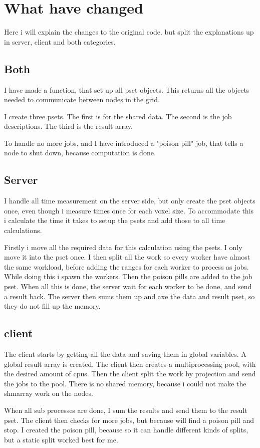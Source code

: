 \documentclass{Article}
\begin{document}
\section{What have changed}
Here i will explain the changes to the original code. but split the explanations up in server, client and both categories.
\subsection{Both}
I have made a function, that set up all pset objects. This returns all the objects needed to communicate between nodes in the grid.

I create three psets. The first is for the shared data. The second is the job descriptions. The third is the result array.

To handle no more jobs, and I have introduced a "poison pill" job, that tells a node to shut down, because computation is done.
\subsection{Server}
I handle all time measurement on the server side, but only create the pset objects once, even though i measure times once for each voxel size. To accommodate this i calculate the time it takes to setup the psets and add those to all time calculations.

Firstly i move all the required data for this calculation using the psets. I only move it into the pset once. I then split all the work so every worker have almost the same workload, before adding the ranges for each worker to process as jobs. While doing this i spawn the workers. Then the poison pills are added to the job pset. When all this is done, the server wait for each worker to be done, and send a result back. The server then sums them up and axe the data and result pset, so they do not fill up the memory.

\subsection{client}
The client starts by getting all the data and saving them in global variables. A global result array is created. The client then creates a multiprocessing pool, with the desired amount of cpus. Then the client split the work by projection and send the jobs to the pool. There is no shared memory, because i could not make the shmarray work on the nodes.

When all sub processes are done, I sum the results and send them to the result pset. The client then checks for more jobs, but because will find a poison pill and stop. I created the poison pill, because so it can handle different kinds of splits, but a static split worked best for me.
\end{document}
